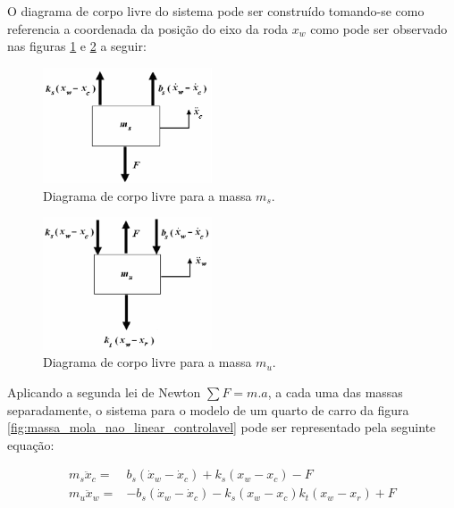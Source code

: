 \documentclass[a4paper]{ifacconf}
\begin{document}
    O diagrama de corpo livre do sistema pode ser construído tomando-se como referencia a coordenada da posição do eixo da roda $x_w$ como pode ser observado nas figuras \ref{fig:corpo_livre_ms} e \ref{fig:corpo_livre_mu} a seguir:
    \FloatBarrier
    \begin{figure}[htbp]
        \begin{centering}
            \includegraphics[width=5cm]{img/corpo_livre_ms.png}
            \caption{Diagrama de corpo livre para a massa $m_s$.} 
            \label{fig:corpo_livre_ms}
        \end{centering}
    \end{figure}
    \FloatBarrier
    \begin{figure}[htbp]
        \begin{centering}
            \includegraphics[width=5cm]{img/corpo_livre_mu.png}
            \caption{Diagrama de corpo livre para a massa $m_u$.} 
            \label{fig:corpo_livre_mu}
        \end{centering}
    \end{figure}
    \FloatBarrier
    
    Aplicando a segunda lei de Newton $\sum{F}=m.a$, a cada uma das massas separadamente, o sistema para o modelo de um quarto de carro da figura \ref{fig:massa_mola_nao_linear_controlavel} pode ser representado pela seguinte equação:
    
    \begin{equation} \label{eq:massa_mola_linear}
    \begin{split}
        m_{s} \ddot{x}_{c} =&  b_{s}(\dot{x}_{w}-\dot{x}_{c}) + k_{s}(x_{w}-x_{c}) - F\ \\
        m_{u} \ddot{x}_{w} =& -b_{s}(\dot{x}_{w}-\dot{x}_{c}) - k_{s}(x_{w}-x_{c})  k_{t}(x_{w}-x_{r}) + F
    \end{split}
    \end{equation}
    
\end{document}
